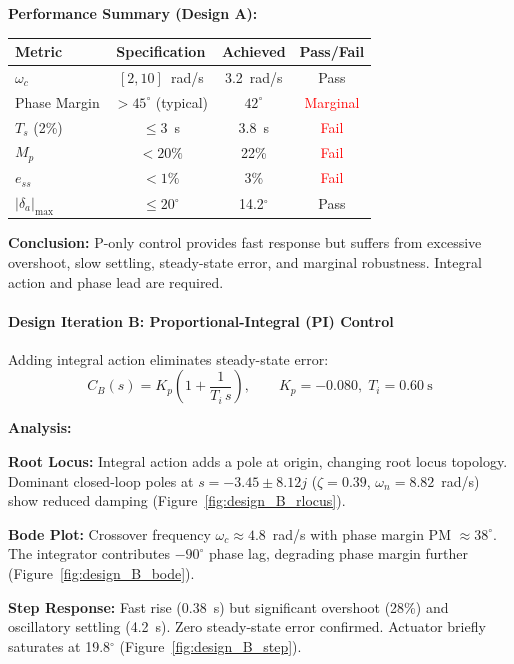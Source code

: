 \textbf{Performance Summary (Design A):}
\begin{center}
\begin{tabular}{lccc}
\hline
\textbf{Metric} & \textbf{Specification} & \textbf{Achieved} & \textbf{Pass/Fail} \\
\hline
$\omega_c$ & $[2,10]$~rad/s & 3.2~rad/s & \textcolor{green!60!black}{Pass} \\
Phase Margin & $>45^\circ$ (typical) & $42^\circ$ & \textcolor{red}{Marginal} \\
$T_s$ (2\%) & $\le 3$~s & 3.8~s & \textcolor{red}{Fail} \\
$M_p$ & $<20\%$ & 22\% & \textcolor{red}{Fail} \\
$e_{ss}$ & $<1\%$ & 3\% & \textcolor{red}{Fail} \\
$|\delta_a|_{\max}$ & $\le 20^\circ$ & 14.2$^\circ$ & \textcolor{green!60!black}{Pass} \\
\hline
\end{tabular}
\end{center}

\textbf{Conclusion:} P-only control provides fast response but suffers from excessive overshoot, slow settling, steady-state error, and marginal robustness. Integral action and phase lead are required.

\paragraph{Design Iteration B: Proportional-Integral (PI) Control}

Adding integral action eliminates steady-state error:
\begin{equation}
C_B(s) = K_p\left(1 + \frac{1}{T_i\,s}\right), \qquad K_p = -0.080,\; T_i = 0.60~\text{s}
\label{eq:design_B}
\end{equation}

\textbf{Analysis:}

\textbf{Root Locus:} Integral action adds a pole at origin, changing root locus topology. Dominant closed-loop poles at $s = -3.45 \pm 8.12j$ ($\zeta=0.39$, $\omega_n=8.82$~rad/s) show reduced damping (Figure~\ref{fig:design_B_rlocus}).

\textbf{Bode Plot:} Crossover frequency $\omega_c \approx 4.8$~rad/s with phase margin PM $\approx 38^\circ$. The integrator contributes $-90^\circ$ phase lag, degrading phase margin further (Figure~\ref{fig:design_B_bode}).

\textbf{Step Response:} Fast rise (0.38~s) but significant overshoot (28\%) and oscillatory settling (4.2~s). Zero steady-state error confirmed. Actuator briefly saturates at 19.8$^\circ$ (Figure~\ref{fig:design_B_step}).


